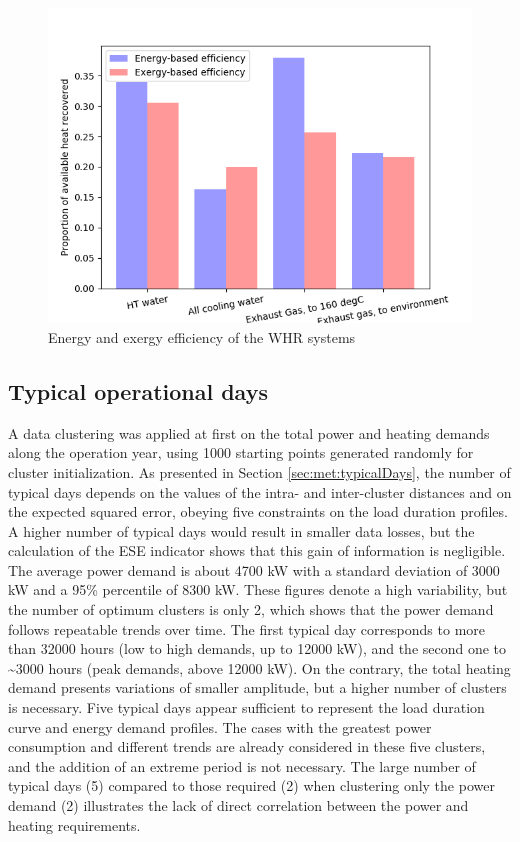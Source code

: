 \documentclass[preprint,12pt]{elsarticle}
\begin{document}
\begin{figure}[htbp]
	\centering
	\includegraphics[width=0.9\linewidth]{Figures/Bar_WHRefficiency}
	\caption{Energy and exergy efficiency of the WHR systems}
	\label{fig:Bar_efficiencyWHR}
\end{figure}


\subsection{Typical operational days}  \label{sec:res:typicalDays}

A data clustering was applied at first on the total power and heating demands along the operation year, using 1000 starting points generated randomly for cluster initialization. As presented in Section \ref{sec:met:typicalDays}, the number of typical days depends on the values of the intra- and inter-cluster distances and on the expected squared error, obeying five constraints on the load duration profiles. A higher number of typical days would result in smaller data losses, but the calculation of the ESE indicator shows that this gain of information is negligible. 
The average power demand is about 4700 kW with a standard deviation of 3000 kW and a 95\% percentile of 8300 kW. These figures denote a high variability, but the number of optimum clusters is only 2, which shows that the power demand follows repeatable trends over time. The first typical day corresponds to more than 32000 hours (low to high demands, up to 12000 kW), and the second one to \~{}3000 hours (peak demands, above 12000 kW). On the contrary, the total heating demand presents variations of smaller amplitude, but a higher number of clusters is necessary. Five typical days appear sufficient to represent the load duration curve and energy demand profiles. The cases with the greatest power consumption and different trends are already considered in these five clusters, and the addition of an extreme period is not necessary. 
The large number of typical days (5) compared to those required (2) when clustering only the power demand (2) illustrates the lack of direct correlation between the power and heating requirements. 
\end{document}
